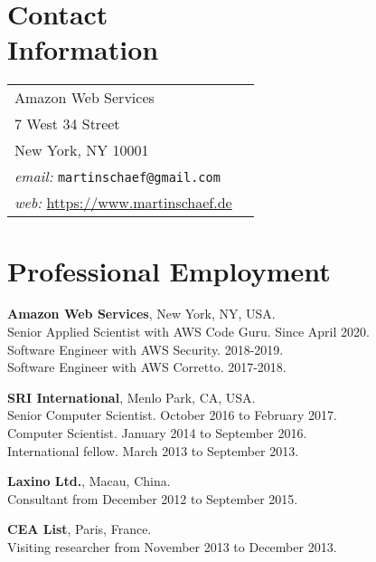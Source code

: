 \documentclass[margin,line]{res}
\begin{document}

\begin{resume}
\section{\sc Contact\\ Information}

\begin{tabular}{@{}p{3in}p{4in}}
Amazon Web Services  & \\%
7 West 34 Street &\\
New York, NY 10001 & \\
\emph{email:}  \texttt{martinschaef@gmail.com} & \\
\emph{web:} \url{https://www.martinschaef.de} & \\
\end{tabular}



%

\section{\sc Professional Employment}

\textbf{Amazon Web Services}, New York, NY, USA.\\
 Senior Applied Scientist with AWS Code Guru. Since April 2020. \\
 Software Engineer with AWS Security. 2018-2019. \\
 Software Engineer with AWS Corretto. 2017-2018. 

\textbf{SRI International}, Menlo Park, CA, USA.\\
 Senior Computer Scientist. October 2016 to February 2017. \\
 Computer Scientist. January 2014 to September 2016. \\
 International fellow. March 2013 to September 2013.

\textbf{Laxino Ltd.}, Macau, China.\\
Consultant from December 2012 to September 2015.

\textbf{CEA List}, Paris, France.\\
Visiting researcher from November 2013 to December 2013.


\end{resume}
\end{document}
